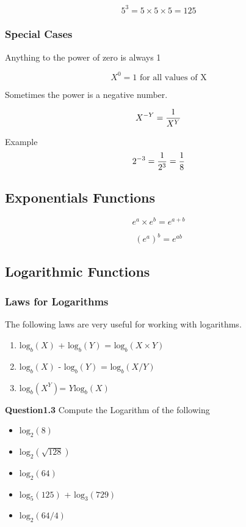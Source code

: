 \documentclass[a4paper,12pt]{article}
\begin{document}
\[  5^ 3 = 5 \times 5 \times 5 =125 \]

\subsubsection{Special Cases}

Anything to the power of zero is always 1

\[  X^ 0 = 1 \mbox{ for all values of X} \]

Sometimes the power is a negative number.

\[  X^{-Y} = { 1 \over X^Y}  \]

Example 
\[  2^{-3} = { 1 \over 2^3} = { 1 \over 8}  \]



\subsection{Exponentials Functions}

\[ e^a \times e^b = e^{a+b}\]

\[ (e^a )^b = e^{ab}\]
\subsection{Logarithmic Functions}

\subsubsection{Laws for Logarithms}
The following laws are very useful for working with logarithms.
\begin{enumerate}
\item $\mbox{log}_b(X)$ + $\mbox{log}_b(Y)$ = $\mbox{log}_b(X\times Y)$
\item $\mbox{log}_b(X)$ - $\mbox{log}_b(Y)$ = $\mbox{log}_b(X / Y)$
\item $\mbox{log}_b(X^Y)$= $Y \mbox{log}_b(X)$
\end{enumerate}

\noindent \textbf{Question1.3} Compute the Logarithm of the following
\begin{itemize}
\item $\mbox{log}_2(8)$
\item $\mbox{log}_2(\sqrt{128})$
\item $\mbox{log}_2(64)$
\item $\mbox{log}_5(125)$ +   $\mbox{log}_3(729)$
\item $\mbox{log}_2(64/4)$
\end{itemize}
\end{document}
